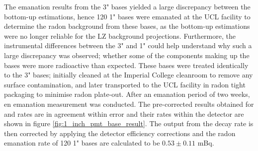The emanation results from the 3" bases yielded a large discrepancy between the bottom-up estimations, hence 120 1" bases were emanated at the UCL facility to determine the radon background from these bases, as the bottom-up estimations were no longer reliable for the LZ background projections. Furthermore, the instrumental differences between the 3" and 1" could help understand why such a large discrepancy was observed; whether some of the components making up the bases were more radioactive than expected. These bases were treated identically to the 3" bases; initially cleaned at the Imperial College cleanroom to remove any surface contamination, and later transported to the UCL facility in radon tight packaging to minimise radon plate-out. After an emanation period of two weeks, en emanation measurement was conducted. The pre-corrected results obtained for \PoTOF{} and \PoTOE{} rates are in agreement within error and their rates within the detector are shown in figure \ref{fig:1_inch_pmt_base_result}. The output from the \PoTOF{} decay rate is then corrected by applying the detector efficiency corrections and the radon emanation rate of 120 1" bases are calculated to be $0.53\pm0.11$ mBq.
%
